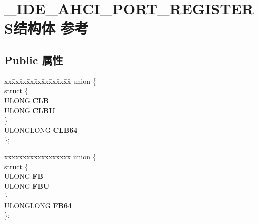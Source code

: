 \hypertarget{struct___i_d_e___a_h_c_i___p_o_r_t___r_e_g_i_s_t_e_r_s}{}\section{\+\_\+\+I\+D\+E\+\_\+\+A\+H\+C\+I\+\_\+\+P\+O\+R\+T\+\_\+\+R\+E\+G\+I\+S\+T\+E\+R\+S结构体 参考}
\label{struct___i_d_e___a_h_c_i___p_o_r_t___r_e_g_i_s_t_e_r_s}
\subsection*{Public 属性}
\begin{DoxyCompactItemize}
\item 
\mbox{\label{struct___i_d_e___a_h_c_i___p_o_r_t___r_e_g_i_s_t_e_r_s_ad8e1a67aff6eaf199f96635be1665a64}} 
\begin{tabbing}
xx\=xx\=xx\=xx\=xx\=xx\=xx\=xx\=xx\=\kill
union \{\\
\mbox{\label{union___i_d_e___a_h_c_i___p_o_r_t___r_e_g_i_s_t_e_r_s_1_1_0D1011_ae415dc486e55d2a72157c96451e71bb3}} 
\>struct \{\\
\>\>ULONG {\bfseries CLB}\\
\>\>ULONG {\bfseries CLBU}\\
\>\} \\
\>ULONGLONG {\bfseries CLB64}\\
\}; \\

\end{tabbing}\item 
\mbox{\label{struct___i_d_e___a_h_c_i___p_o_r_t___r_e_g_i_s_t_e_r_s_a848b0d7a34789ea3e1707f8f94514d05}} 
\begin{tabbing}
xx\=xx\=xx\=xx\=xx\=xx\=xx\=xx\=xx\=\kill
union \{\\
\mbox{\label{union___i_d_e___a_h_c_i___p_o_r_t___r_e_g_i_s_t_e_r_s_1_1_0D1013_afcafb3ce73f426f14a9ed4c11e25ff0b}} 
\>struct \{\\
\>\>ULONG {\bfseries FB}\\
\>\>ULONG {\bfseries FBU}\\
\>\} \\
\>ULONGLONG {\bfseries FB64}\\
\}; \\


\end{tabbing}
\end{DoxyCompactItemize}
